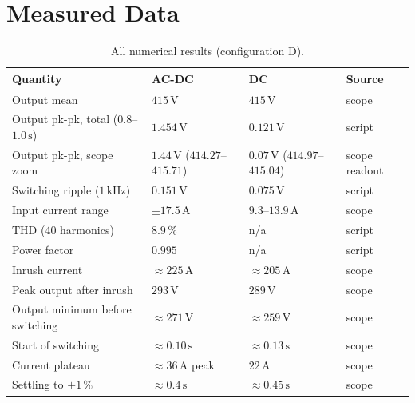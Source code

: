\documentclass[11pt,a4paper]{article}
\begin{document}
\section{Measured Data}
\begin{table}[htbp]
\centering
\small
\begin{tabular}{|p{5.2cm}|p{2.6cm}|p{2.6cm}|p{2.6cm}|}
\hline
Quantity & AC-DC & DC & Source \\ \hline
Output mean & $415\,\mathrm{V}$ & $415\,\mathrm{V}$ & scope \\
Output pk-pk, total ($0.8$--$1.0\,\mathrm{s}$) & $1.454\,\mathrm{V}$ & $0.121\,\mathrm{V}$ & script \\
Output pk-pk, scope zoom & $1.44\,\mathrm{V}$ ($414.27$--$415.71$) & $0.07\,\mathrm{V}$ ($414.97$--$415.04$) & scope readout \\
Switching ripple ($1\,\mathrm{kHz}$) & $0.151\,\mathrm{V}$ & $0.075\,\mathrm{V}$ & script \\
Input current range & $\pm17.5\,\mathrm{A}$ & $9.3$--$13.9\,\mathrm{A}$ & scope \\
THD (40 harmonics) & $8.9\,\%$ & n/a & script \\
Power factor & $0.995$ & n/a & script \\
Inrush current & $\approx225\,\mathrm{A}$ & $\approx205\,\mathrm{A}$ & scope \\
Peak output after inrush & $293\,\mathrm{V}$ & $289\,\mathrm{V}$ & scope \\
Output minimum before switching & $\approx271\,\mathrm{V}$ & $\approx259\,\mathrm{V}$ & scope \\
Start of switching & $\approx0.10\,\mathrm{s}$ & $\approx0.13\,\mathrm{s}$ & scope \\
Current plateau & $\approx36\,\mathrm{A}$ peak & $22\,\mathrm{A}$ & scope \\
Settling to $\pm1\,\%$ & $\approx0.4\,\mathrm{s}$ & $\approx0.45\,\mathrm{s}$ & scope \\ \hline
\end{tabular}
\caption{All numerical results (configuration D).}
\end{table}
\end{document}
